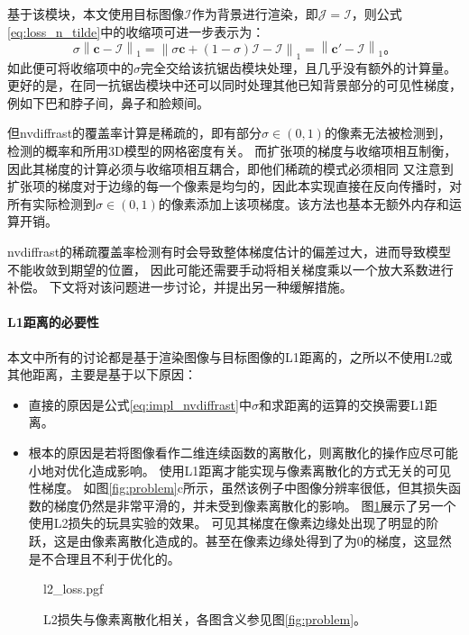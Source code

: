 基于该模块，本文使用目标图像$\mathcal{I}$作为背景进行渲染，即$\mathcal{J}=\mathcal{I}$，则公式\ref{eq:loss_n_tilde}中的收缩项可进一步表示为：
\begin{equation}
\sigma\left\| \mathbf{c} - \mathcal{I} \right\|_1 =
\left\| \sigma\mathbf{c} + (1-\sigma)\mathcal{I} - \mathcal{I} \right\|_1 =
\left\| \mathbf{c}' - \mathcal{I} \right\|_1
\text{。}
\label{eq:impl_nvdiffrast}
\end{equation}
如此便可将收缩项中的$\sigma$完全交给该抗锯齿模块处理，且几乎没有额外的计算量。
更好的是，在同一抗锯齿模块中还可以同时处理其他已知背景部分的可见性梯度，例如下巴和脖子间，鼻子和脸颊间。

但nvdiffrast的覆盖率计算是稀疏的，即有部分$\sigma\in(0,1)$的像素无法被检测到，检测的概率和所用3D模型的网格密度有关。
而扩张项的梯度与收缩项相互制衡，因此其梯度的计算必须与收缩项相互耦合，即他们稀疏的模式必须相同
又注意到扩张项的梯度对于边缘的每一个像素是均匀的，因此本实现直接在反向传播时，对所有实际检测到$\sigma\in(0,1)$的像素添加上该项梯度。该方法也基本无额外内存和运算开销。

nvdiffrast的稀疏覆盖率检测有时会导致整体梯度估计的偏差过大，进而导致模型不能收敛到期望的位置，
因此可能还需要手动将相关梯度乘以一个放大系数进行补偿。
下文将对该问题进一步讨论，并提出另一种缓解措施。

\paragraph{L1距离的必要性}
本文中所有的讨论都是基于渲染图像与目标图像的L1距离的，之所以不使用L2或其他距离，主要是基于以下原因：
\begin{itemize}
\item 直接的原因是公式\ref{eq:impl_nvdiffrast}中$\sigma$和求距离的运算的交换需要L1距离。
\item 根本的原因是若将图像看作二维连续函数的离散化，则离散化的操作应尽可能小地对优化造成影响。
使用L1距离才能实现与像素离散化的方式无关的可见性梯度。
如图\ref{fig:problem}c所示，虽然该例子中图像分辨率很低，但其损失函数的梯度仍然是非常平滑的，并未受到像素离散化的影响。
图\ref{fig:l2_loss}展示了另一个使用L2损失的玩具实验的效果。
可见其梯度在像素边缘处出现了明显的阶跃，这是由像素离散化造成的。甚至在像素边缘处得到了为0的梯度，这显然是不合理且不利于优化的。
\end{itemize}

\begin{figure}
    \centering
    {l2_loss.pgf}
    \caption[L2损失与像素离散化相关]{L2损失与像素离散化相关，各图含义参见图\ref{fig:problem}。}
    \label{fig:l2_loss}
\end{figure}

